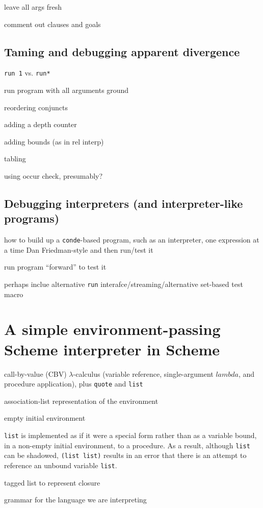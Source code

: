 \documentclass{book}
\begin{document}
leave all args fresh

comment out clauses and goals

\section{Taming and debugging apparent divergence}

\verb|run 1| vs. \verb|run*|

run program with all arguments ground

reordering conjuncts

adding a depth counter

adding bounds (as in rel interp)

tabling

using occur check, presumably?

\section{Debugging interpreters (and interpreter-like programs)}

how to build up a \verb|conde|-based program, such as an interpreter, one expression at a time Dan Friedman-style and then run/test it

run program ``forward'' to test it

perhaps inclue alternative \verb|run| interafce/streaming/alternative set-based test macro


\chapter{A simple environment-passing Scheme interpreter in Scheme}%

call-by-value (CBV) $\lambda$-calculus (variable reference, single-argument $lambda$, and procedure application), plus \verb|quote| and \verb|list|

association-list representation of the environment

empty initial environment

\verb|list| is implemented as if it were a special form rather than as a variable bound, in a non-empty initial environment, to a procedure.  As a result, although \verb|list| can be shadowed, \verb|(list list)| results in an error that there is an attempt to reference an unbound variable \verb|list|.

tagged list to represent closure

grammar for the language we are interpreting
\end{document}
